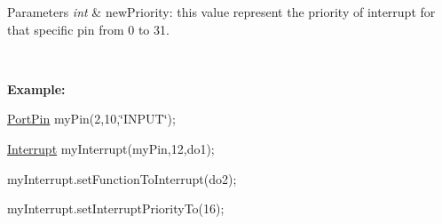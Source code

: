 \begin{DoxyParams}{Parameters}
{\em int} & newPriority: this value represent the priority of interrupt for that specific pin from 0 to 31.\par
 \par
\\
\hline
\end{DoxyParams}
{\bfseries Example:}\par
 \hyperlink{class_port_pin}{PortPin} myPin(2,10,\char`\"{}INPUT\char`\"{});\par
 \hyperlink{class_interrupt}{Interrupt} myInterrupt(myPin,12,do1); \par
 myInterrupt.setFunctionToInterrupt(do2);\par
 myInterrupt.setInterruptPriorityTo(16);\par
 